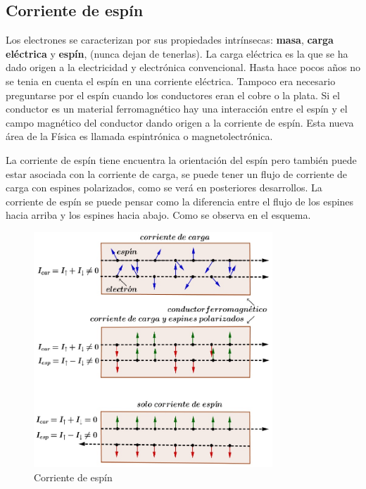 \subsection{Corriente de espín}

Los electrones se caracterizan por sus propiedades intrínsecas: \textbf{masa}, \textbf{carga eléctrica} y \textbf{espín}, (nunca dejan de tenerlas). La carga eléctrica es la que se ha dado origen a la electricidad y electrónica convencional.
Hasta hace pocos años no se tenia en cuenta el espín en una corriente eléctrica. Tampoco era necesario preguntarse por el espín cuando los conductores eran el cobre o la plata. Si el conductor es un material ferromagnético hay una interacción entre el espín y el campo magnético del conductor dando origen a la corriente de espín. Esta nueva área de la Física es llamada espintrónica o magnetolectrónica.

La corriente de espín tiene encuentra la orientación del espín pero también puede estar asociada con la corriente de carga, se puede tener un flujo de corriente de carga con espines polarizados, como se verá en posteriores desarrollos. La corriente de espín se puede pensar como la diferencia entre el flujo de los espines hacia arriba y los espines hacia abajo. Como se observa en el esquema.

\begin{figure}[H]
    \centering
    \includegraphics[width=0.8\textwidth]{./Figures/fig335}
	\caption{Corriente de espín}
	\label{fig:335}
\end{figure}

